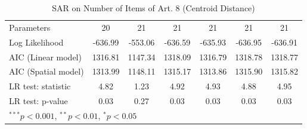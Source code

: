 \begin{table}[!h]
\begin{center}
\begin{tabular}{l c c c c c c }
Parameters              & 20           & 21           & 21           & 21           & 21           & 21           \\
Log Likelihood          & -636.99      & -553.06      & -636.59      & -635.93      & -636.95      & -636.91      \\
AIC (Linear model)      & 1316.81      & 1147.34      & 1318.09      & 1316.79      & 1318.78      & 1318.77      \\
AIC (Spatial model)     & 1313.99      & 1148.11      & 1315.17      & 1313.86      & 1315.90      & 1315.82      \\
LR test: statistic      & 4.82         & 1.23         & 4.92         & 4.93         & 4.88         & 4.95         \\
LR test: p-value        & 0.03         & 0.27         & 0.03         & 0.03         & 0.03         & 0.03         \\
\bottomrule
\multicolumn{7}{l}{\scriptsize{$^{***}p<0.001$, $^{**}p<0.01$, $^*p<0.05$}}
\end{tabular}
\caption{SAR on Number of Items of Art. 8 (Centroid Distance)}
\label{table:coefficients}
\end{center}
\end{table}
